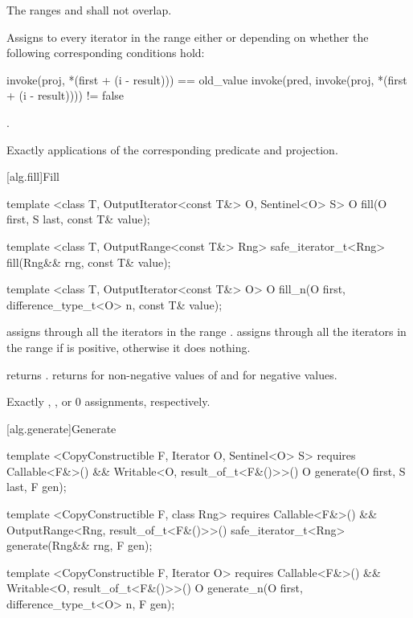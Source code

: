 \begin{itemdescr}
\pnum
\requires
The ranges
and
shall not overlap.

\pnum
\effects
Assigns to every iterator
in the
range
either
or
depending on whether the following corresponding conditions hold:

\begin{codeblock}
invoke(proj, *(first + (i - result))) == old_value
invoke(pred, invoke(proj, *(first + (i - result)))) != false
\end{codeblock}

\pnum
\returns
{}.

\pnum
\complexity
Exactly
applications of the corresponding predicate and projection.
\end{itemdescr}

[alg.fill]{Fill}

%
%
\begin{itemdecl}
template <class T, OutputIterator<const T&> O, Sentinel<O> S>
  O fill(O first, S last, const T& value);

template <class T, OutputRange<const T&> Rng>
  safe_iterator_t<Rng>
    fill(Rng&& rng, const T& value);

template <class T, OutputIterator<const T&> O>
  O fill_n(O first, difference_type_t<O> n, const T& value);
\end{itemdecl}

\begin{itemdescr}
\pnum
\effects
{} assigns  through all the
iterators in the range . 
assigns  through all the iterators in the range 
if  is positive, otherwise it does nothing.

\pnum
\returns {} returns .  returns 
for non-negative values of  and  for negative values.

\pnum
\complexity
Exactly
,
, or 0 assignments, respectively.
\end{itemdescr}

[alg.generate]{Generate}

%
%
\begin{itemdecl}
template <CopyConstructible F, Iterator O, Sentinel<O> S>
    requires Callable<F&>() && Writable<O, result_of_t<F&()>>()
  O generate(O first, S last, F gen);

template <CopyConstructible F, class Rng>
    requires Callable<F&>() && OutputRange<Rng, result_of_t<F&()>>()
  safe_iterator_t<Rng>
    generate(Rng&& rng, F gen);

template <CopyConstructible F, Iterator O>
    requires Callable<F&>() && Writable<O, result_of_t<F&()>>()
  O generate_n(O first, difference_type_t<O> n, F gen);
\end{itemdecl}

